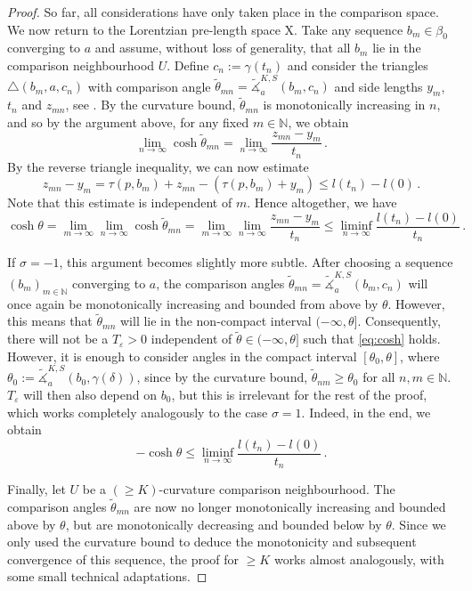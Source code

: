 \documentclass[11pt,reqno]{amsart}
\theoremstyle{definition}
\newcommand{\Cref}[1]{\zcref[S]{#1}}
\theoremstyle{definition}
\theoremstyle{plain}
\theoremstyle{remark}
\begin{document}
\begin{proof}
    So far, all considerations have only taken place in the comparison space. We now return to the Lorentzian pre-length space X. Take any sequence $b_m \in \beta_0$ converging to $a$ and assume, without loss of generality, that all $b_m$ lie in the comparison neighbourhood $U$.  
    Define $c_n:=\gamma(t_n)$ and consider the triangles $\triangle (b_m, a, c_n)$ with comparison angle $\widetilde\theta_{mn}=  \widetilde\measuredangle^{K,S}_a (b_m, c_n)$ and side lengths $y_m$, $t_n$ and $z_{mn}$, see \Cref{fig:fvf}.
    By the curvature bound, $\widetilde\theta_{mn}$ is monotonically increasing in $n$, and so by the argument above, for any fixed $m\in \mathbb{N}$, we obtain
    \[\lim_{n\to \infty} \cosh{\widetilde\theta_{mn}} = \lim_{n\to\infty} \frac{z_{mn}-y_m}{t_n} \, .\]
    By the reverse triangle inequality, we can now estimate
    \[z_{mn}-y_m=\tau(p,b_m)+z_{mn}-(\tau(p,b_m)+y_m)\leq l(t_n)-l(0) \, .\]
    Note that this estimate is independent of $m$. Hence altogether, we have
    \[\cosh\theta =\lim_{m\to\infty}\lim_{n\to\infty}\cosh \widetilde\theta_{mn}=\lim_{m\to\infty}\lim_{n\to\infty}\frac{z_{mn}-y_m}{t_n} \leq \liminf_{n\to\infty} \frac{l(t_n)-l(0)}{t_n} \, .\]

    If $\sigma=-1$, this argument becomes slightly more subtle. After choosing a sequence $(b_m)_{m\in\mathbb N}$ converging to $a$, the comparison angles $\widetilde\theta_{mn}=  \widetilde\measuredangle^{K,S}_a (b_m, c_n)$ will once again be monotonically increasing and bounded from above by $\theta$. However, this means that $\widetilde\theta_{mn}$ will lie in the non-compact interval $(-\infty,\theta]$. Consequently, there will not be a $T_\varepsilon>0$ independent of $\widetilde\theta\in(-\infty,\theta]$ such that \eqref{eq:cosh} holds. However, it is enough to consider angles in the compact interval $[\theta_0,\theta]$, where $\theta_0:=\widetilde\measuredangle_a^{K,S}(b_0,\gamma(\delta))$, since by the curvature bound, $\widetilde\theta_{nm}\geq\theta_0$ for all $n,m\in\mathbb N$. $T_\varepsilon$ will then also depend on $b_0$, but this is irrelevant for the rest of the proof, which works completely analogously to the case $\sigma=1$. Indeed, in the end, we obtain
    \[-\cosh\theta\leq\liminf_{n\to\infty}\frac{l(t_n)-l(0)}{t_n} \, .\]

Finally, let $U$ be a $(\geq K)$-curvature comparison neighbourhood. The comparison angles $\widetilde\theta_{mn}$ are now no longer monotonically increasing and bounded above by $\theta$, but are monotonically decreasing and bounded below by $\theta$. Since we only used the curvature bound to deduce the monotonicity and subsequent convergence of this sequence, the proof for $\geq K$ works almost analogously, with some small technical adaptations.
\end{proof}
\end{document}
